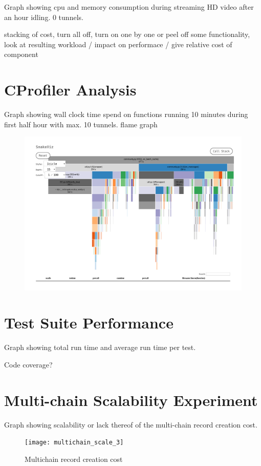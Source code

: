 Graph showing cpu and memory consumption during streaming HD video after an hour idling. 0 tunnels.



stacking of cost, turn all off, turn on one by one or peel off some functionality, look at resulting workload / impact on performace / give relative cost of component


\section{CProfiler Analysis}
Graph showing wall clock time spend on functions running 10 minutes during first half hour with max. 10 tunnels.
flame graph

\begin{figure}[h]
	\centering
	\includegraphics[width=\textwidth]{profile_1468515157}
	\caption{}
	\label{fig:profile_1468515157}
\end{figure}


\section{Test Suite Performance}
Graph showing total run time and average run time per test.

Code coverage?


\section{Multi-chain Scalability Experiment}
Graph showing scalability or lack thereof of the multi-chain record creation cost.

\begin{figure}[h]
	\centering
	\texttt{[image: multichain\_scale\_3]}
	\caption{Multichain record creation cost}
	\label{fig:multichain_scale}
\end{figure}

